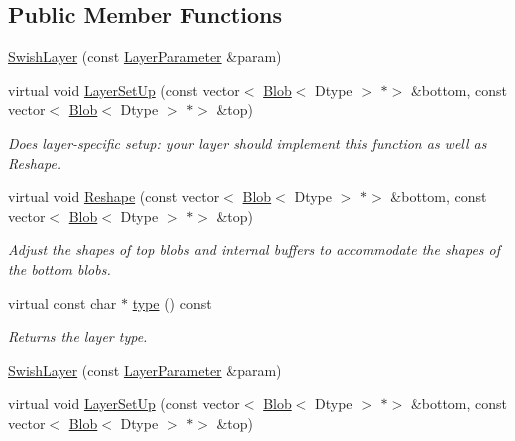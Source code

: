 \subsection*{Public Member Functions}
\begin{DoxyCompactItemize}
\item 
\mbox{\hyperlink{classcaffe_1_1_swish_layer_afd59cd91314ef60acef0d3ba80500818}{Swish\+Layer}} (const \mbox{\hyperlink{classcaffe_1_1_layer_parameter}{Layer\+Parameter}} \&param)
\item 
virtual void \mbox{\hyperlink{classcaffe_1_1_swish_layer_a35bd01fae515cb064107c621a3c12820}{Layer\+Set\+Up}} (const vector$<$ \mbox{\hyperlink{classcaffe_1_1_blob}{Blob}}$<$ Dtype $>$ $\ast$$>$ \&bottom, const vector$<$ \mbox{\hyperlink{classcaffe_1_1_blob}{Blob}}$<$ Dtype $>$ $\ast$$>$ \&top)
\begin{DoxyCompactList}\small\item\em Does layer-\/specific setup\+: your layer should implement this function as well as Reshape. \end{DoxyCompactList}\item 
virtual void \mbox{\hyperlink{classcaffe_1_1_swish_layer_a995afbac7e3adc0bfe157b0458656a9e}{Reshape}} (const vector$<$ \mbox{\hyperlink{classcaffe_1_1_blob}{Blob}}$<$ Dtype $>$ $\ast$$>$ \&bottom, const vector$<$ \mbox{\hyperlink{classcaffe_1_1_blob}{Blob}}$<$ Dtype $>$ $\ast$$>$ \&top)
\begin{DoxyCompactList}\small\item\em Adjust the shapes of top blobs and internal buffers to accommodate the shapes of the bottom blobs. \end{DoxyCompactList}\item 
\mbox{\label{classcaffe_1_1_swish_layer_af38fb1a508cda2e5ae86b67fd27ce16c}} 
virtual const char $\ast$ \mbox{\hyperlink{classcaffe_1_1_swish_layer_af38fb1a508cda2e5ae86b67fd27ce16c}{type}} () const
\begin{DoxyCompactList}\small\item\em Returns the layer type. \end{DoxyCompactList}\item 
\mbox{\hyperlink{classcaffe_1_1_swish_layer_afd59cd91314ef60acef0d3ba80500818}{Swish\+Layer}} (const \mbox{\hyperlink{classcaffe_1_1_layer_parameter}{Layer\+Parameter}} \&param)
\item 
virtual void \mbox{\hyperlink{classcaffe_1_1_swish_layer_a04035cc9ca9be4b99aba41197b16f2e4}{Layer\+Set\+Up}} (const vector$<$ \mbox{\hyperlink{classcaffe_1_1_blob}{Blob}}$<$ Dtype $>$ $\ast$$>$ \&bottom, const vector$<$ \mbox{\hyperlink{classcaffe_1_1_blob}{Blob}}$<$ Dtype $>$ $\ast$$>$ \&top)

\end{DoxyCompactItemize}
